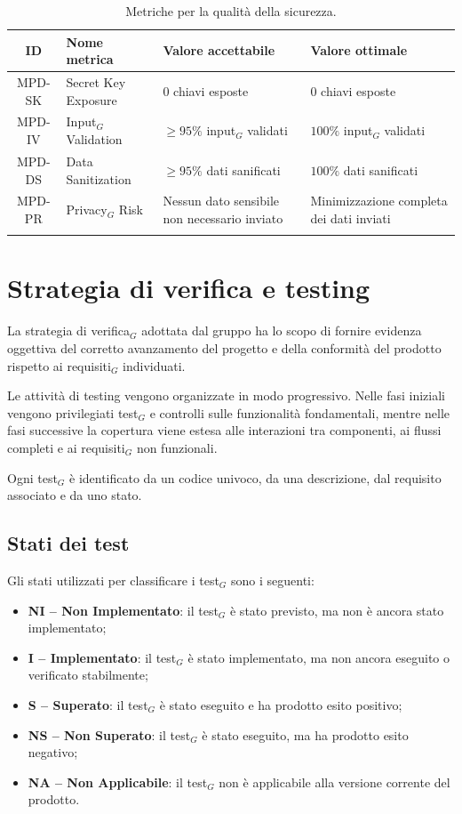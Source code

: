 \documentclass[a4paper, 10pt, colorlinks=true, linkcolor=black, urlcolor=blue, citecolor=blue, hidelinks]{article}
\begin{document}
\begingroup
\small
\renewcommand{\arraystretch}{1.25}
\begin{longtable}{|c|p{4cm}|p{3cm}|p{3cm}|}
    \hline
    \textbf{ID} & \textbf{Nome metrica} & \textbf{Valore accettabile} & \textbf{Valore ottimale} \\
    \hline
    \endhead

    MPD-SK & Secret Key Exposure & $0$ chiavi esposte & $0$ chiavi esposte \\ \hline
    MPD-IV & Input$_G$ Validation & $\geq 95\%$ input$_G$ validati & $100\%$ input$_G$ validati \\ \hline
    MPD-DS & Data Sanitization & $\geq 95\%$ dati sanificati & $100\%$ dati sanificati \\ \hline
    MPD-PR & Privacy$_G$ Risk & Nessun dato sensibile non necessario inviato & Minimizzazione completa dei dati inviati \\ \hline

    \caption{Metriche per la qualità della sicurezza.}
    \label{tab:metriche-sicurezza}
\end{longtable}
\endgroup

\section{Strategia di verifica e testing}

La strategia di verifica$_G$ adottata dal gruppo ha lo scopo di fornire evidenza oggettiva del corretto avanzamento del progetto e della conformità del prodotto rispetto ai requisiti$_G$ individuati.

Le attività di testing vengono organizzate in modo progressivo. Nelle fasi iniziali vengono privilegiati test$_G$ e controlli sulle funzionalità fondamentali, mentre nelle fasi successive la copertura viene estesa alle interazioni tra componenti, ai flussi completi e ai requisiti$_G$ non funzionali.

Ogni test$_G$ è identificato da un codice univoco, da una descrizione, dal requisito associato e da uno stato.

\subsection{Stati dei test}

Gli stati utilizzati per classificare i test$_G$ sono i seguenti:

\begin{itemize}
    \item \textbf{NI -- Non Implementato}: il test$_G$ è stato previsto, ma non è ancora stato implementato;
    \item \textbf{I -- Implementato}: il test$_G$ è stato implementato, ma non ancora eseguito o verificato stabilmente;
    \item \textbf{S -- Superato}: il test$_G$ è stato eseguito e ha prodotto esito positivo;
    \item \textbf{NS -- Non Superato}: il test$_G$ è stato eseguito, ma ha prodotto esito negativo;
    \item \textbf{NA -- Non Applicabile}: il test$_G$ non è applicabile alla versione corrente del prodotto.
\end{itemize}
\end{document}
